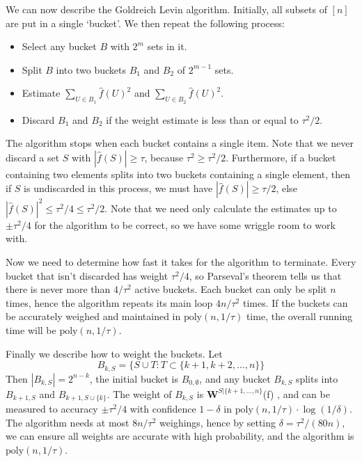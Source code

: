 We can now describe the Goldreich Levin algorithm. Initially, all subsets of $[n]$ are put in a single `bucket'. We then repeat the following process:
%
\begin{itemize}
    \item Select any bucket $B$ with $2^m$ sets in it.
    \item Split $B$ into two buckets $B_1$ and $B_2$ of $2^{m-1}$ sets.
    \item Estimate $\sum_{U \in B_1} \widehat{f}(U)^2$ and $\sum_{U \in B_2} \widehat{f}(U)^2$.
    \item Discard $B_1$ and $B_2$ if the weight estimate is less than or equal to $\tau^2/2$.
\end{itemize}
%
The algorithm stops when each bucket contains a single item. Note that we never discard a set $S$ with $|\widehat{f}(S)| \geq \tau$, because $\tau^2 \geq \tau^2/2$. Furthermore, if a bucket containing two elements splits into two buckets containing a single element, then if $S$ is undiscarded in this process, we must have $|\widehat{f}(S)| \geq \tau/2$, else $|\widehat{f}(S)|^2 \leq \tau^2/4 \leq \tau^2/2$. Note that we need only calculate the estimates up to $\pm \tau^2/4$ for the algorithm to be correct, so we have some wriggle room to work with.

Now we need to determine how fast it takes for the algorithm to terminate. Every bucket that isn't discarded has weight $\tau^2/4$, so Parseval's theorem tells us that there is never more than $4/\tau^2$ active buckets. Each bucket can only be split $n$ times, hence the algorithm repeats its main loop $4n/\tau^2$ times. If the buckets can be accurately weighed and maintained in $\text{poly}(n,1/\tau)$ time, the overall running time will be $\text{poly}(n,1/\tau)$.

Finally we describe how to weight the buckets. Let
%
\[ B_{k,S} = \{ S \cup T : T \subset \{ k + 1, k + 2, \dots, n \} \} \]
%
Then $|B_{k,S}| = 2^{n-k}$, the initial bucket is $B_{0,\emptyset}$, and any bucket $B_{k,S}$ splits into $B_{k+1,S}$ and $B_{k+1, S \cup \{ k \}}$. The weight of $B_{k,S}$ is $\mathbf{W}^{S|\{ k+1, \dots, n \}}$(f)
, and can be measured to accuracy $\pm \tau^2/4$ with confidence $1-\delta$ in $\text{poly}(n,1/\tau) \cdot \log(1/\delta)$. The algorithm needs at most $8n/\tau^2$ weighings, hence by setting $\delta = \tau^2/(80n)$, we can ensure all weights are accurate with high probability, and the algorithm is $\text{poly}(n,1/\tau)$.



